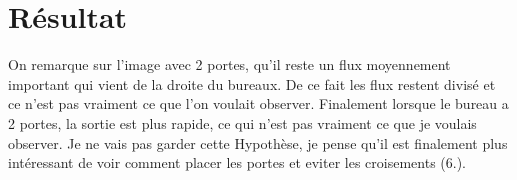 \documentclass[12pt]{article}
\begin{document}
\section{Résultat}

On remarque sur l'image avec 2 portes, qu'il reste un flux moyennement important qui vient de la droite du bureaux. De ce fait
les flux restent divisé et ce n'est pas vraiment ce que l'on voulait observer.
\newline\newline
Finalement lorsque le bureau a 2 portes, la sortie est plus rapide, ce qui n'est pas vraiment ce que je voulais observer.
\newline\newline
Je ne vais pas garder cette Hypothèse, je pense qu'il est finalement plus intéressant de voir comment placer les portes et eviter les croisements (6.).
\end{document}
